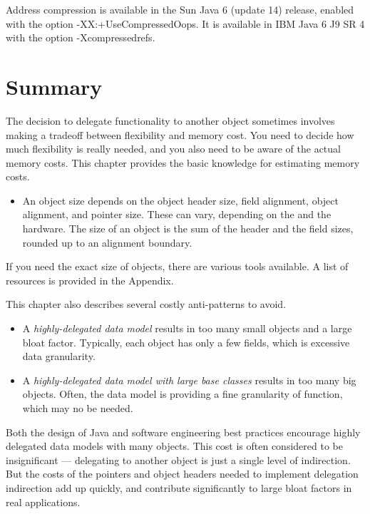 Address compression is available in the Sun Java 6 (update 14) release, enabled with the option -XX:+UseCompressedOops. It is available in IBM Java 6 J9 SR 4 with the option -Xcompressedrefs.

\section{Summary}

The decision to delegate functionality to another object sometimes involves making a tradeoff between flexibility and memory cost. You need to decide how much flexibility is really needed, and you also need to be aware of the actual memory costs. This chapter provides the basic knowledge for estimating memory costs. 
\begin{itemize}
\item An object size depends on the object header size, field alignment, object
alignment, and pointer size. These can vary, depending on the \jre and the
hardware. The size of an object is the sum of the header and the field
sizes, rounded up to an alignment boundary. 
\end{itemize}
If you need the exact size of objects, there are various tools available. A list of resources is provided in the Appendix.

This chapter also describes several costly anti-patterns to avoid.
\begin{itemize}
\item A \textit{highly-delegated data model} results in too many small objects and a large bloat factor. Typically, each object has only a few fields, which is excessive data granularity.  
\item A \textit{highly-delegated data model with large base classes} results in too many big objects. Often, the data model is providing a fine granularity of function, which may no be needed.
\end{itemize}   

Both the design of Java and software engineering best practices encourage highly delegated data models with many objects. This cost is often considered to be insignificant --- delegating to another object is just a single level of indirection. But the costs of the pointers and object headers needed to implement delegation indirection add up quickly, and contribute significantly to large bloat factors in real applications. 

  


